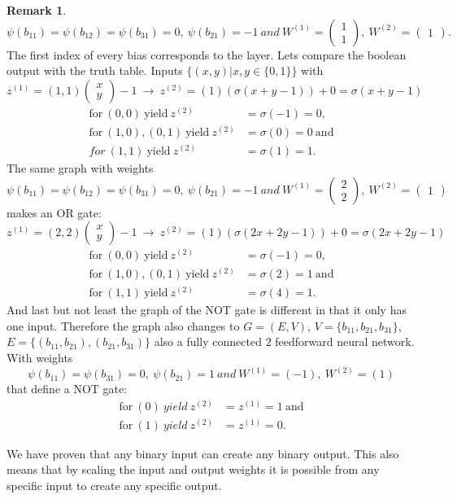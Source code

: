 \documentclass{article}
\theoremstyle{definition}
\newtheorem{remark}[theorem]{Remark}
\begin{document}
\begin{remark}
$$\psi(b_{11})=\psi(b_{12})=\psi(b_{31})=0, \ \psi(b_{21})=-1 \ and \ W^{(1)}=\begin{pmatrix}1\\1\end{pmatrix}, \ W^{(2)}=\begin{pmatrix}1\end{pmatrix}.$$
The first index of every bias corresponds to the layer. Lets compare the boolean output with the truth table. Inputs $\{(x, y)|x, y \in \{0, 1\}\}$ with
$$z^{(1)}=(1, 1)\begin{pmatrix}x\\y\end{pmatrix}-1 \ \to \ z^{(2)} = (1)(\sigma(x+y-1))+0 = \sigma(x+y-1)$$
\begin{align*}
\text{for} \ (0, 0) \ \text{yield} \ z^{(2)}&=\sigma(-1)=0, \\
\text{for} \ (1, 0), (0, 1) \ \text{yield} \ z^{(2)}&=\sigma(0)=0 \ \text{and} \\
for \ (1, 1) \ \text{yield} \ z^{(2)}&=\sigma(1)=1.
\end{align*}
The same graph with weights
$$\psi(b_{11})=\psi(b_{12})=\psi(b_{31})=0, \ \psi(b_{21})=-1 \ and \ W^{(1)}=\begin{pmatrix}2\\2\end{pmatrix}, \ W^{(2)}=\begin{pmatrix}1\end{pmatrix}$$
makes an OR gate:
$$z^{(1)}=(2, 2)\begin{pmatrix}x\\y\end{pmatrix}-1 \ \to \ z^{(2)} = (1)(\sigma(2x+2y-1))+0 = \sigma(2x+2y-1)$$
\begin{align*}
\text{for} \ (0, 0) \ \text{yield} \ z^{(2)}&=\sigma(-1)=0, \\
\text{for} \ (1, 0), (0, 1) \ \text{yield} \ z^{(2)}&=\sigma(2)=1 \ \text{and} \\
\text{for} \ (1, 1) \ \text{yield} \ z^{(2)}&=\sigma(4)=1.
\end{align*}
And last but not least the graph of the NOT gate is different in that it only has one input. Therefore the graph also changes to $G=(E, V)$, $V=\{ b_{11}, b_{21}, b_{31} \}$, $E=\{ (b_{11}, b_{21}), (b_{21}, b_{31})\}$ also a fully connected $2$ feedforward neural network. With weights
$$\psi(b_{11})=\psi(b_{31})=0, \ \psi(b_{21})=1 \ and \ W^{(1)}=(-1), \ W^{(2)}=(1)$$
that define a NOT gate:
\begin{align*}
\text{for} \ (0) \ yield \ z^{(2)}&= z^{(1)} = 1 \ \text{and} \\
\text{for} \ (1) \ yield \ z^{(2)}&= z^{(1)} = 0.
\end{align*}

We have proven that any binary input can create any binary output. This also means that by scaling the input and output weights it is possible from any specific input to create any specific output.

\end{remark}
\end{document}

